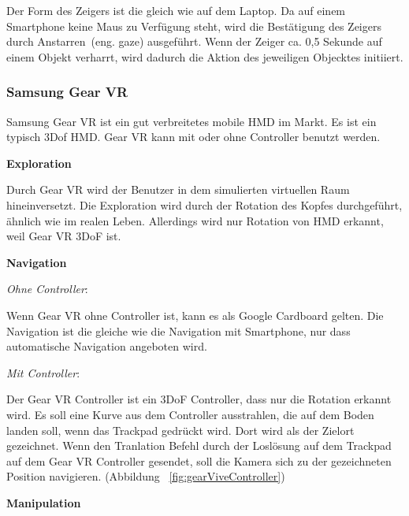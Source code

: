   \noindent
  Der Form des Zeigers ist die gleich wie auf dem Laptop. Da auf einem Smartphone keine Maus zu Verfügung steht, wird die Bestätigung des Zeigers durch \glqq Anstarren\grqq\ (eng. gaze) ausgeführt. Wenn der Zeiger ca. 0,5 Sekunde auf einem Objekt verharrt, wird dadurch die Aktion des jeweiligen Objecktes initiiert.
  
 \subsubsection{Samsung Gear VR}
 Samsung Gear VR ist ein gut verbreitetes mobile HMD im Markt. Es ist ein typisch 3Dof HMD. Gear VR kann mit oder ohne Controller benutzt werden.
 
  \vspace{1em}
  \noindent
  \textbf{Exploration}
  \vspace{1em}
  
  \noindent
  Durch Gear VR wird der Benutzer in dem simulierten virtuellen Raum hineinversetzt. Die Exploration wird durch der Rotation des Kopfes durchgeführt, ähnlich wie im realen Leben. Allerdings wird nur Rotation von HMD erkannt, weil Gear VR 3DoF ist.
  
  \vspace{1em}
  \noindent
  \textbf{Navigation}
  \vspace{1em}
  
  \noindent
  \textsl{Ohne Controller}:
  \vspace{0.5em}
  
  \noindent
  Wenn Gear VR ohne Controller ist, kann es als Google Cardboard gelten. Die Navigation ist die gleiche wie die Navigation mit Smartphone, nur dass automatische Navigation angeboten wird.
 
  \vspace{0.5em}
  \noindent
  \textsl{Mit Controller}:
  \vspace{0.5em}
  
  \noindent
  Der Gear VR Controller ist ein 3DoF Controller, dass nur die Rotation erkannt wird. Es soll eine Kurve aus dem Controller ausstrahlen, die auf dem Boden landen soll, wenn das Trackpad gedrückt wird. Dort wird als der Zielort gezeichnet. Wenn den Tranlation Befehl durch der Loslösung auf dem Trackpad auf dem Gear VR Controller gesendet, soll die Kamera sich zu der gezeichneten Position navigieren. (Abbildung ~\ref{fig:gearViveController})

  \vspace{1em}
  \noindent
  \textbf{Manipulation}
  \vspace{1em}
  
